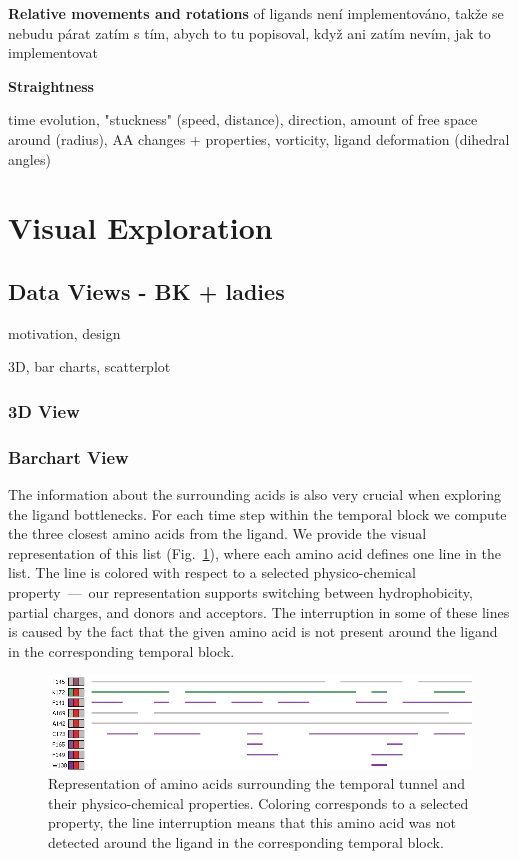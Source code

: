 \documentclass[twocolumn]{bmcart}%
\begin{document}
\begin{itemize}
{\color{red}\item \textbf{Relative movements and rotations} of ligands není implementováno, takže se nebudu párat zatím s tím, abych to tu popisoval, když ani zatím nevím, jak to implementovat} 

\item \textbf{Straightness} 

\end{itemize}


time evolution, "stuckness" (speed, distance), direction, amount of free space around (radius), AA changes + properties, vorticity, ligand deformation (dihedral angles)

\section*{Visual Exploration}

\subsection*{Data Views - BK + ladies}
motivation, design

3D, bar charts, scatterplot

\subsubsection*{3D View}

\subsubsection*{Barchart View}


The information about the surrounding acids is also very crucial when exploring the ligand bottlenecks. 
For each time step within the temporal block we compute the three closest amino acids from the ligand. 
We provide the visual representation of this list (Fig.~\ref{fig:aacids}), where each amino acid defines one line in the list. 
The line is colored with respect to a selected physico-chemical property~---~our representation supports switching between hydrophobicity, partial charges, and donors and acceptors.
The interruption in some of these lines is caused by the fact that the given amino acid is not present around the ligand in the corresponding temporal block.

\begin{figure}[htb]
	\centering
  \includegraphics[width=0.95\linewidth]{img/aacids.png}
  \caption{\label{fig:aacids} Representation of amino acids surrounding the temporal tunnel and their physico-chemical properties. Coloring corresponds to a selected property, the line interruption means that this amino acid was not detected around the ligand in the corresponding temporal block.}
\end{figure}
\end{document}
